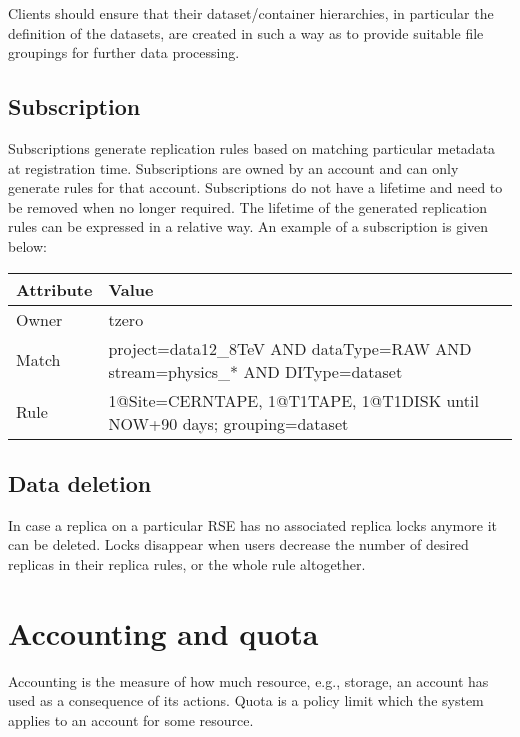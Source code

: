 \documentclass{atlasnote}
\begin{document}
Clients should ensure that their dataset/container hierarchies, in particular the definition of the datasets, are created in such a way as to provide suitable file groupings for further data processing.

\subsection{Subscription}
\label{sec:Subscription}

Subscriptions generate replication rules based on matching particular metadata at registration time. Subscriptions are owned by an account and can only generate rules for that account. Subscriptions do not have a lifetime and need to be removed when no longer required. The lifetime of the generated replication rules can be expressed in a relative way. An example of a subscription is given below:

\bigskip

\begin{tabular}{l p{11cm}}
\toprule
\textbf{Attribute} & \textbf{Value} \\
\midrule
Owner & tzero \\
Match & project=data12\_8TeV AND dataType=RAW AND stream=physics\_* AND DIType=dataset \\
Rule & 1@Site=CERNTAPE, 1@T1TAPE, 1@T1DISK until NOW+90 days; grouping=dataset \\
\bottomrule
\end{tabular}

\subsection{Data deletion}
\label{sec:Datadeletion}

In case a replica on a particular RSE has no associated replica locks anymore it can be deleted. Locks disappear when users decrease the number of desired replicas in their replica rules, or the whole rule altogether.

\section{Accounting and quota}
\label{overview_Accounting_and_quota:accounting-and-quota}

Accounting is the measure of how much resource, e.g., storage, an account has used as a consequence of its actions. Quota is a policy limit which the system applies to an account for some resource.
\end{document}
